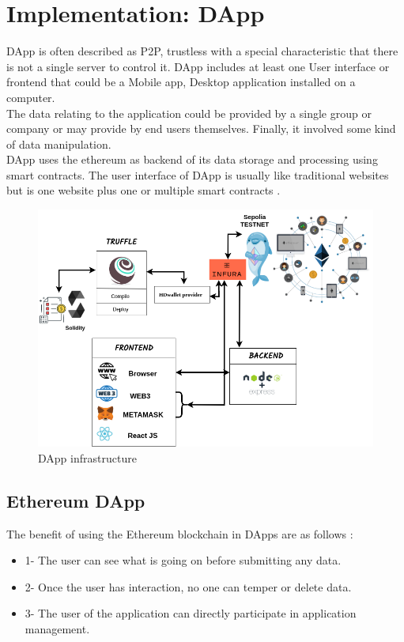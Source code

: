 \chapter{Implementation: DApp}
DApp is often described as P2P, trustless with a special characteristic that there is not a single server to control it. DApp includes at least one User interface or frontend that could be a Mobile app, Desktop application installed on a computer.\\
The data relating to the application could be provided by a single group or company or may provide by end users themselves. Finally, it involved some kind of data manipulation. \\
DApp uses the ethereum as backend of its data storage and processing using smart contracts. The user interface of DApp is usually like traditional websites but is one website plus one or multiple smart contracts \cite{William}.

\begin{center}
	
	\begin{figure}[htb!]
		
		\begin{minipage}{0.75\linewidth}
			
			\includegraphics[width=1.45\textwidth]{images/chap03_dapp.png}
		\end{minipage}
		\caption{DApp infrastructure}
		
	\end{figure}
	
\end{center}

\section{Ethereum DApp}
The benefit of using the Ethereum blockchain in DApps are as follows \cite{William}:
 \begin{itemize}
     \item 1- The user can see what is going on before submitting any data.
     \item 2- Once the user has interaction, no one can temper or delete data.
     \item 3- The user of the application can directly participate in application management.
 \end{itemize}
